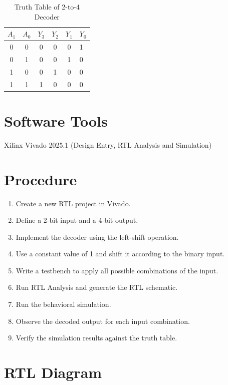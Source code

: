 \documentclass[12pt,a4paper]{report}
\begin{document}
\begin{table}[H]
    \centering
    \caption{Truth Table of 2-to-4 Decoder}
    \label{tab:decoder_shift}
    \begin{tabular}{|c|c|c|c|c|}
    \hline
    \textbf{$A_1$} & \textbf{$A_0$} & \textbf{$Y_3$} &
    \textbf{$Y_2$} & \textbf{$Y_1$} & \textbf{$Y_0$} \\
     & 0 & 0 & 0 & 0 & 1 \\
     & 1 & 0 & 0 & 1 & 0 \\
     & 0 & 0 & 1 & 0 & 0 \\
     & 1 & 1 & 0 & 0 & 0 \\
    \hline
    \end{tabular}
\end{table}

\section{Software Tools}

Xilinx Vivado 2025.1 (Design Entry, RTL Analysis and Simulation)

\section{Procedure}

\begin{enumerate}
    \item Create a new RTL project in Vivado.
    \item Define a 2-bit input and a 4-bit output.
    \item Implement the decoder using the left-shift operation.
    \item Use a constant value of 1 and shift it according to the binary input.
    \item Write a testbench to apply all possible combinations of the input.
    \item Run RTL Analysis and generate the RTL schematic.
    \item Run the behavioral simulation.
    \item Observe the decoded output for each input combination.
    \item Verify the simulation results against the truth table.
\end{enumerate}

\section{RTL Diagram}
\end{document}
